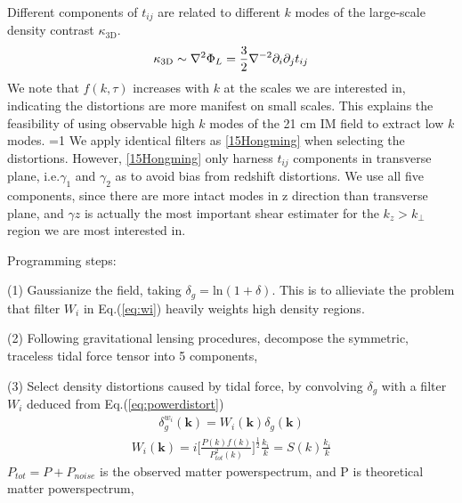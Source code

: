 Different components of $t_{ij}$ are related to different $k$ modes of the large-scale density contrast $\kappa_\mathrm{3D}$.
\begin{eqnarray}
    \label{eq:largepoten}
    \kappa_\mathrm{3D}\sim\nabla^2\Phi_L=\frac{3}{2}\nabla^{-2}\partial_i\partial_j t_{ij}
\end{eqnarray}
 We note that $f(k,\tau)$ increases with $k$ at the scales we are interested in, indicating the distortions are more manifest on small scales. This explains  the feasibility of using observable high $k$ modes of the 21 cm IM field to extract low $k$ modes. 
=1
We apply identical filters as \ref{15Hongming} 
when selecting the distortions. 
However, \ref{15Hongming} only harness $t_{ij}$ components 
in transverse plane, i.e.$\gamma_1$ and $\gamma_2$ 
as to avoid bias from redshift distortions. 
We use all five components, since there are more intact modes in 
z direction than transverse plane, 
and $\gamma z$ is actually the most important 
shear estimater for the $k_z>k_\perp$ region 
we are most interested in.

Programming steps:\noindent

(1) Gaussianize the field, taking 
$\delta_g=\mathrm{ln}(1+\delta)$. 
This is to allieviate the problem that filter $W_i$ in Eq.(\ref{eq:wi}) heavily weights high density regions.

(2) Following gravitational lensing procedures, decompose the symmetric, traceless tidal force tensor into 5 components, 

(3) Select density distortions caused by tidal force, 
by convolving $\delta_g$ with a filter $W_i$ 
deduced from Eq.(\ref{eq:powerdistort}) 
\begin{eqnarray}
\delta^{w_i}_g(\bm{k})=W_i(\bm{k})\delta_g(\bm{k}) 
\end{eqnarray}
\begin{eqnarray}
\label{eq:wi}
W_i(\bm{k})=i \bigg[\frac{P(k)f(k)}{P_{tot}^2(k)}\bigg]^{\frac{1}{2}}\frac{k_i}{k}
=S(k)\frac{k_i}{k}\nonumber
\end{eqnarray}
$P_{tot}=P+P_{noise}$ is the observed matter powerspectrum, 
and P is theoretical matter powerspectrum,

